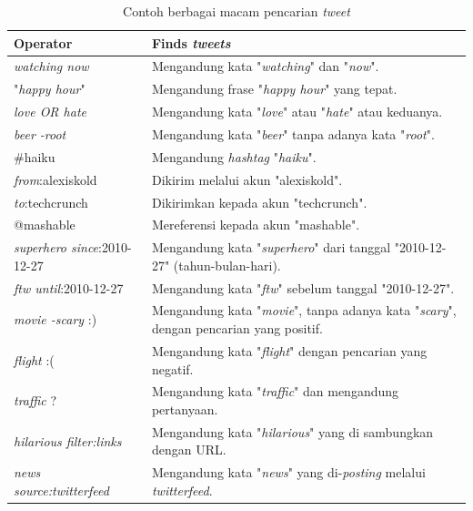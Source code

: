 \begin{table}[h]
\begin{tabular}{|p{5cm}|p{9cm}|}
\hline
\textbf{Operator}          					& \textbf{Finds \textit{tweets}}                                            \\ \hline
\textit{watching now}               & Mengandung kata "\textit{watching}" dan "\textit{now}".						       \\
"\textit{happy hour}"               & Mengandung frase "\textit{happy hour}" yang tepat.                                 \\
\textit{love OR hate}               & Mengandung kata "\textit{love}" atau "\textit{hate}" atau keduanya.                             \\
\textit{beer -root}                 & Mengandung kata "\textit{beer}" tanpa adanya kata "\textit{root}".                                         \\
\#haiku                    					& Mengandung \textit{hashtag} "\textit{haiku}".                                            \\
\textit{from}:alexiskold            & Dikirim melalui akun "alexiskold".                                            \\
\textit{to}:techcrunch              & Dikirimkan kepada akun "techcrunch".                                              \\
@mashable                  					& Mereferensi kepada akun "mashable".                                            \\
\textit{superhero since}:2010-12-27 & Mengandung kata "\textit{superhero}" dari tanggal "2010-12-27" (tahun-bulan-hari). \\
\textit{ftw until}:2010-12-27       & Mengandung kata "\textit{ftw}" sebelum tanggal "2010-12-27".                   \\
\textit{movie -scary} :)            & Mengandung kata "\textit{movie}", tanpa adanya kata "\textit{scary}", dengan pencarian yang positif.        \\
\textit{flight} :(                  & Mengandung kata "\textit{flight}" dengan pencarian yang negatif.                         \\
\textit{traffic} ?                  & Mengandung kata "\textit{traffic}" dan mengandung pertanyaan.                               \\
\textit{hilarious filter:links}     & Mengandung kata "\textit{hilarious}" yang di sambungkan dengan URL.                                \\
\textit{news source:twitterfeed}    & Mengandung kata "\textit{news}" yang di-\textit{posting} melalui \textit{twitterfeed}.						\\        \hline                     
\end{tabular}
\caption{Contoh berbagai macam pencarian \textit{tweet}}
\label{tab:MacamPencarianTweet}
\end{table}


